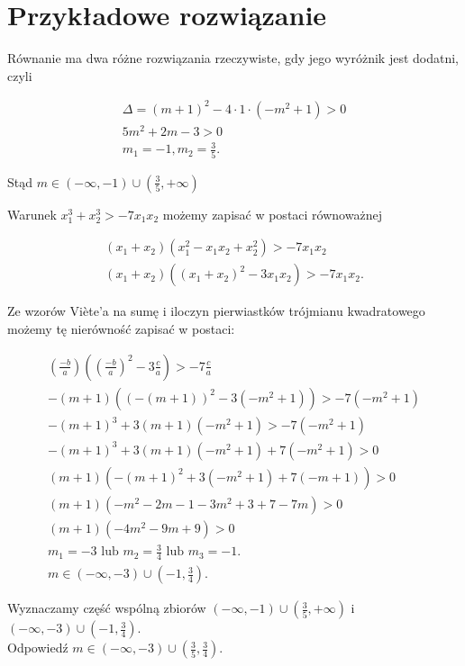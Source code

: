 \documentclass[10pt]{article}
\begin{document}
\section*{Przykładowe rozwiązanie}
Równanie ma dwa różne rozwiązania rzeczywiste, gdy jego wyróżnik jest dodatni, czyli

$$
\begin{gathered}
\Delta=(m+1)^{2}-4 \cdot 1 \cdot\left(-m^{2}+1\right)>0 \\
5 m^{2}+2 m-3>0 \\
m_{1}=-1, m_{2}=\frac{3}{5} .
\end{gathered}
$$

Stąd $m \in(-\infty,-1) \cup\left(\frac{3}{5},+\infty\right)$

Warunek $x_{1}^{3}+x_{2}^{3}>-7 x_{1} x_{2}$ możemy zapisać w postaci równoważnej

$$
\begin{gathered}
\left(x_{1}+x_{2}\right)\left(x_{1}^{2}-x_{1} x_{2}+x_{2}^{2}\right)>-7 x_{1} x_{2} \\
\left(x_{1}+x_{2}\right)\left(\left(x_{1}+x_{2}\right)^{2}-3 x_{1} x_{2}\right)>-7 x_{1} x_{2} .
\end{gathered}
$$

Ze wzorów Viète'a na sumę i iloczyn pierwiastków trójmianu kwadratowego możemy tę nierówność zapisać w postaci:

$$
\begin{gathered}
\left(\frac{-b}{a}\right)\left(\left(\frac{-b}{a}\right)^{2}-3 \frac{c}{a}\right)>-7 \frac{c}{a} \\
-(m+1)\left((-(m+1))^{2}-3\left(-m^{2}+1\right)\right)>-7\left(-m^{2}+1\right) \\
-(m+1)^{3}+3(m+1)\left(-m^{2}+1\right)>-7\left(-m^{2}+1\right) \\
-(m+1)^{3}+3(m+1)\left(-m^{2}+1\right)+7\left(-m^{2}+1\right)>0 \\
(m+1)\left(-(m+1)^{2}+3\left(-m^{2}+1\right)+7(-m+1)\right)>0 \\
(m+1)\left(-m^{2}-2 m-1-3 m^{2}+3+7-7 m\right)>0 \\
(m+1)\left(-4 m^{2}-9 m+9\right)>0 \\
m_{1}=-3 \text { lub } m_{2}=\frac{3}{4} \text { lub } m_{3}=-1 . \\
m \in(-\infty,-3) \cup\left(-1, \frac{3}{4}\right) .
\end{gathered}
$$

Wyznaczamy część wspólną zbiorów $(-\infty,-1) \cup\left(\frac{3}{5},+\infty\right)$ i $(-\infty,-3) \cup\left(-1, \frac{3}{4}\right)$.\\
Odpowiedź $m \in(-\infty,-3) \cup\left(\frac{3}{5}, \frac{3}{4}\right)$.
\end{document}
